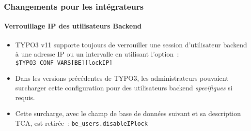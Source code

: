 %

\begin{frame}[fragile]
	\frametitle{Changements pour les intégrateurs}
	\framesubtitle{Verrouillage IP des utilisateurs Backend}


	\begin{itemize}
		\item TYPO3 v11 supporte toujours de verrouiller une session d'utilisateur
			backend à une adresse IP ou un intervalle en utilisant l'option~:\newline
			\smaller\texttt{\$TYPO3\_CONF\_VARS[BE][lockIP]}\normalsize
		\item Dans les versions précédentes de TYPO3, les administrateurs pouvaient
			surcharger cette configuration pour des utilisateurs backend \textit{specifiques}
			si requis.
		\item Cette surcharge, avec le champ de base de données suivant et sa description TCA,
			est retirée~:\newline
			\smaller\texttt{be\_users.disableIPlock}\normalsize
	\end{itemize}
\end{frame}

